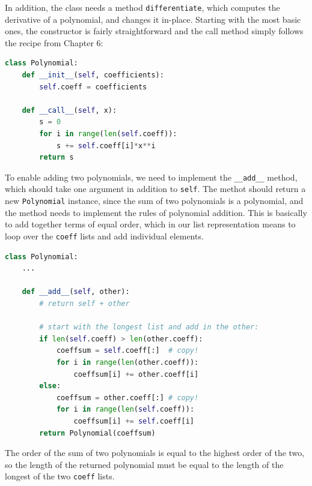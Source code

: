 \documentclass[graybox,envcountchap,sectrefs,final]{svmonodo}
\begin{document}
\noindent
In addition, the class needs a method \texttt{differentiate}, which computes the derivative of a polynomial, and changes
it in-place. Starting with the most basic ones, the constructor is fairly straightforward and the call method
simply follows the recipe from Chapter 6:
\begin{lstlisting}[language=Python,style=blue1]
class Polynomial:
    def __init__(self, coefficients):
        self.coeff = coefficients

    def __call__(self, x):
        s = 0
        for i in range(len(self.coeff)):
            s += self.coeff[i]*x**i
        return s
\end{lstlisting}
To enable adding two polynomials, we need to implement the \Verb!__add__! method, which should take one argument in addition
to \texttt{self}. The methot should return a new \texttt{Polynomial} instance, since the sum of two polynomials is a polynomial, and
the method needs to implement the rules of polynomial addition. This is basically to add together terms of equal
order, which in our list representation means to loop over the \texttt{coeff} lists and add individual elements.
\begin{lstlisting}[language=Python,style=blue1]
class Polynomial:
    ...

    def __add__(self, other):
        # return self + other

        # start with the longest list and add in the other:
        if len(self.coeff) > len(other.coeff):
            coeffsum = self.coeff[:]  # copy!
            for i in range(len(other.coeff)):
                coeffsum[i] += other.coeff[i]
        else:
            coeffsum = other.coeff[:] # copy!
            for i in range(len(self.coeff)):
                coeffsum[i] += self.coeff[i]
        return Polynomial(coeffsum)
\end{lstlisting}
The order of the sum of two polynomials is equal to the highest order of the two, so the length of the returned
polynomial must be equal to the length of the longest of the two \texttt{coeff} lists.
\end{document}
